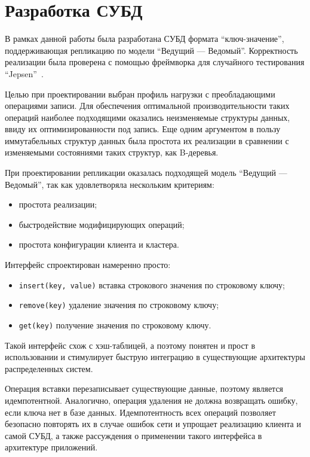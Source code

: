 \documentclass[14pt, russian]{scrartcl}
\begin{document}
\section{Разработка СУБД}

В рамках данной работы была разработана СУБД формата ``ключ-значение'',
поддерживающая репликацию по модели ``Ведущий --- Ведомый''. Корректность
реализации была проверена с помощью фреймворка для случайного тестирования
``Jepsen''~\cite{jepsen}.

Целью при проектировании выбран профиль нагрузки с преобладающими операциями
записи. Для обеспечения оптимальной производительности таких операций наиболее
подходящими оказались неизменяемые структуры данных, ввиду их оптимизированности
под запись. Еще одним аргументом в пользу иммутабельных структур данных была
простота их реализации в сравнении с изменяемыми состояниями таких структур, как
B-деревья.

При проектировании репликации оказалась подходящей модель ``Ведущий ---
Ведомый'', так как удовлетворяла нескольким критериям:

\begin{itemize}
  \item простота реализации;
  \item быстродействие модифицирующих операций;
  \item простота конфигурации клиента и кластера.
\end{itemize}

Интерфейс спроектирован намеренно просто:

\begin{itemize}
  \item \verb|insert(key, value)| вставка строкового значения по строковому ключу;
  \item \verb|remove(key)| удаление значения по строковому ключу;
  \item \verb|get(key)| получение значения по строковому ключу.
\end{itemize}

Такой интерфейс схож с хэш-таблицей, а поэтому понятен и прост в использовании и
стимулирует быструю интеграцию в существующие архитектуры распределенных систем.

Операция вставки перезаписывает существующие данные, поэтому является
идемпотентной. Аналогично, операция удаления не должна возвращать ошибку, если
ключа нет в базе данных. Идемпотентность всех операций позволяет безопасно
повторять их в случае ошибок сети и упрощает реализацию клиента и самой СУБД, а
также рассуждения о применении такого интерфейса в архитектуре приложений.
\end{document}
